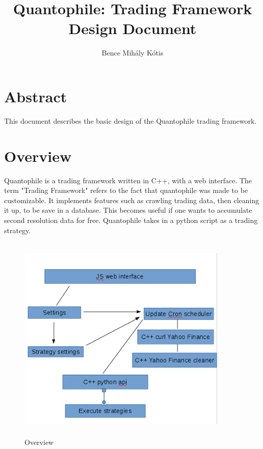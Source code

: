 \documentclass[a4paper]{article}
\begin{document}
\author{Bence Mih\'aly K\'otis}
\title{Quantophile: Trading Framework Design Document}
\maketitle

\clearpage

\tableofcontents

\clearpage
\section{Abstract }
This document describes the basic design of the Quantophile trading framework. 


\section{Overview}
    Quantophile is a trading framework written in C++, with a web interface. The term "Trading Framework" refers to the fact that quantophile was made to be customizable. It implements features such as crawling trading data, then cleaning it up, to be save in a database. This becomes useful if one wants to accumulate second resolution data for free. Quantophile takes in a python script as a trading strategy.


    
   \begin{center}
    \begin{figure}[h]
    \includegraphics[height=10cm, width=10cm] {overview.png}
    \caption{Overview}
    \end{figure}
    \end{center}
\end{document}
